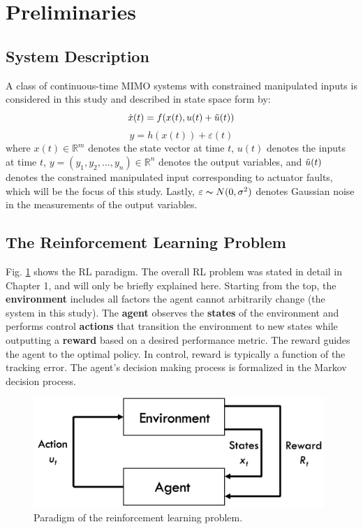 \section{Preliminaries}
\subsection{System Description}
A class of continuous-time MIMO systems with constrained manipulated inputs is considered in this study and described in state space form by:
\begin{equation}
\dot{x}(t) = f(x(t), u(t) + \Tilde{u}(t))
\label{eq:system_states}
\end{equation}
\begin{equation}
y = h(x(t)) + \varepsilon(t)
\label{eq:system_output}
\end{equation}
where $x(t) \in {\mathbb{R}}^m$ denotes the state vector at time $t$, $u(t)$ denotes the inputs at time $t$, $y = (y_{1}, y_{2}, ..., y_{n}) \in {\mathbb{R}}^n$ denotes the output variables, and $\Tilde{u}(t)$ denotes the constrained manipulated input corresponding to actuator faults, which will be the focus of this study. Lastly, $\varepsilon \thicksim N(0, \sigma^2)$ denotes Gaussian noise in the measurements of the output variables.

\subsection{The Reinforcement Learning Problem}
Fig. \ref{fig:MDP_Setup} shows the RL paradigm. The overall RL problem was stated in detail in Chapter 1, and will only be briefly explained here. Starting from the top, the \textbf{environment} includes all factors the agent cannot arbitrarily change (the system in this study). The \textbf{agent} observes the \textbf{states} of the environment and performs control \textbf{actions} that transition the environment to new states while outputting a \textbf{reward} based on a desired performance metric. The reward guides the agent to the optimal policy. In control, reward is typically a function of the tracking error. The agent's decision making process is formalized in the Markov decision process.
\begin{figure}[h]
    \begin{center}
        \includegraphics[width=11cm]{images/ftc/MDP_Setup.png}
        \caption{\label{fig:MDP_Setup} Paradigm of the reinforcement learning problem.}
    \end{center}
\end{figure}
